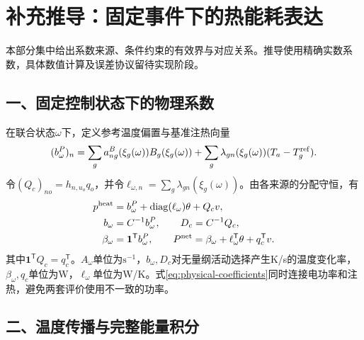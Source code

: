 \section*{补充推导：固定事件下的热能耗表达}
\label{sec:formal-details}

本部分集中给出系数来源、条件约束的有效界与对应关系。推导使用精确实数系数，具体数值计算及误差协议留待实现阶段。

\subsection*{一、固定控制状态下的物理系数}

在联合状态\(\omega\)下，定义参考温度偏置与基准注热向量
\begin{equation}
(b^P_\omega)_n=
\sum_g a^B_{ng}(\xi_g(\omega))B_g(\xi_g(\omega))
+\sum_g\lambda_{gn}(\xi_g(\omega))(T_a-T_g^{\rm ref}).
\label{eq:baseline-vector}
\end{equation}
令\((Q_c)_{no}=h_{n,u_o}q_o\)，并令\(\ell_{\omega,n}=\sum_g\lambda_{gn}(\xi_g(\omega))\)。由各来源的分配守恒，有
\begin{equation}
\begin{aligned}
p^{\rm heat}&=b^P_\omega+\operatorname{diag}(\ell_\omega)\theta+Q_cv,\\
b_\omega&=C^{-1}b^P_\omega,\qquad D_c=C^{-1}Q_c,\\
\beta_\omega&=\mathbf1^{\mathsf T}b^P_\omega,\qquad
P^{\rm net}=\beta_\omega+\ell_\omega^{\mathsf T}\theta+q_c^{\mathsf T}v.
\end{aligned}
\label{eq:physical-coefficients}
\end{equation}
其中\(\mathbf1^{\mathsf T}Q_c=q_c^{\mathsf T}\)。\(A_\omega\)单位为\(\mathrm{s}^{-1}\)，\(b_\omega,D_c\)对无量纲活动选择产生K/s的温度变化率，\(\beta_\omega,q_c\)单位为W，\(\ell_\omega\)单位为W/K。式\eqref{eq:physical-coefficients}同时连接电功率和注热，避免两套评价使用不一致的功率。

\subsection*{二、温度传播与完整能量积分}

